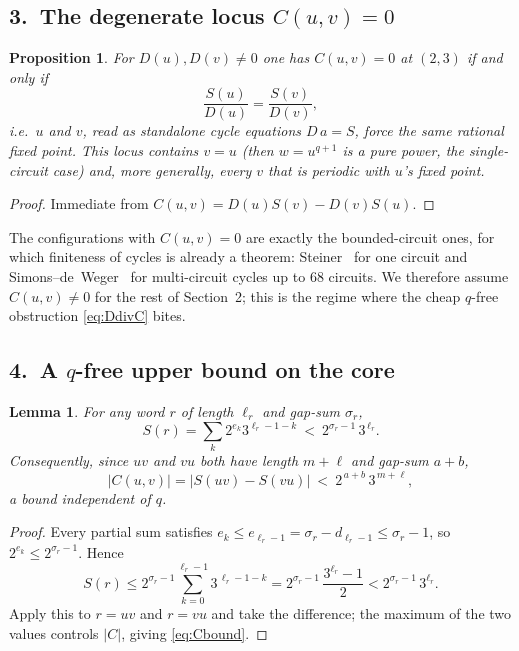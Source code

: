 \documentclass[11pt,a4paper]{article}
\theoremstyle{bourbaki}
\newtheorem{prop}[thm]{Proposition}
\newtheorem{lem}[thm]{Lemma}
\theoremstyle{bourbakidef}
\begin{document}
\subsection*{3.\ The degenerate locus $C(u,v)=0$}

\begin{prop}\label{prop:Czero}
For $D(u),D(v)\ne 0$ one has $C(u,v)=0$ at $(2,3)$ if and only if
\[
   \frac{S(u)}{D(u)}=\frac{S(v)}{D(v)},
\]
i.e.\ $u$ and $v$, read as standalone cycle equations $D\,a=S$, force the \emph{same}
rational fixed point. This locus contains $v=u$ (then $w=u^{q+1}$ is a pure power, the
single-circuit case) and, more generally, every $v$ that is periodic with $u$'s fixed
point.
\end{prop}

\begin{proof}
Immediate from $C(u,v)=D(u)S(v)-D(v)S(u)$.
\end{proof}

The configurations with $C(u,v)=0$ are exactly the bounded-circuit ones, for which
finiteness of cycles is already a theorem: Steiner~\cite{Steiner} for one circuit and
Simons--de~Weger~\cite{SdW} for multi-circuit cycles up to $68$ circuits. We therefore
assume $C(u,v)\ne 0$ for the rest of Section~2; this is the regime where the cheap
$q$-free obstruction \eqref{eq:DdivC} bites.

\subsection*{4.\ A $q$-free upper bound on the core}

\begin{lem}\label{lem:Cbound}
For any word $r$ of length $\ell_{r}$ and gap-sum $\sigma_{r}$,
\[
   S(r)=\sum_{k}2^{e_{k}}3^{\ell_{r}-1-k}\ <\ 2^{\sigma_{r}-1}\,3^{\,\ell_{r}} .
\]
Consequently, since $uv$ and $vu$ both have length $m+\ell$ and gap-sum $a+b$,
\begin{equation}\label{eq:Cbound}
   \lvert C(u,v)\rvert=\lvert S(uv)-S(vu)\rvert
   \ <\ 2^{\,a+b}\,3^{\,m+\ell},
\end{equation}
a bound \emph{independent of $q$}.
\end{lem}

\begin{proof}
Every partial sum satisfies $e_{k}\le e_{\ell_{r}-1}=\sigma_{r}-d_{\ell_{r}-1}\le\sigma_{r}-1$,
so $2^{e_{k}}\le 2^{\sigma_{r}-1}$. Hence
\[
   S(r)\le 2^{\sigma_{r}-1}\sum_{k=0}^{\ell_{r}-1}3^{\,\ell_{r}-1-k}
        =2^{\sigma_{r}-1}\,\frac{3^{\ell_{r}}-1}{2}
        <2^{\sigma_{r}-1}\,3^{\ell_{r}} .
\]
Apply this to $r=uv$ and $r=vu$ and take the difference; the maximum of the two values
controls $\lvert C\rvert$, giving \eqref{eq:Cbound}.
\end{proof}
\end{document}
